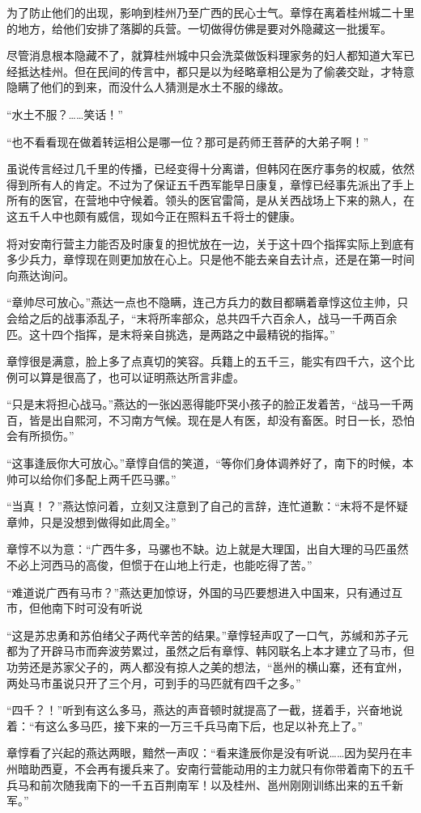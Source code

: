 为了防止他们的出现，影响到桂州乃至广西的民心士气。章惇在离着桂州城二十里的地方，给他们安排了落脚的兵营。一切做得仿佛是要对外隐藏这一批援军。

尽管消息根本隐藏不了，就算桂州城中只会洗菜做饭料理家务的妇人都知道大军已经抵达桂州。但在民间的传言中，都只是以为经略章相公是为了偷袭交趾，才特意隐瞒了他们的到来，而没什么人猜测是水土不服的缘故。

“水土不服？……笑话！”

“也不看看现在做着转运相公是哪一位？那可是药师王菩萨的大弟子啊！”

虽说传言经过几千里的传播，已经变得十分离谱，但韩冈在医疗事务的权威，依然得到所有人的肯定。不过为了保证五千西军能早日康复，章惇已经事先派出了手上所有的医官，在营地中守候着。领头的医官雷简，是从关西战场上下来的熟人，在这五千人中也颇有威信，现如今正在照料五千将士的健康。

将对安南行营主力能否及时康复的担忧放在一边，关于这十四个指挥实际上到底有多少兵力，章惇现在则更加放在心上。只是他不能去亲自去计点，还是在第一时间向燕达询问。

“章帅尽可放心。”燕达一点也不隐瞒，连己方兵力的数目都瞒着章惇这位主帅，只会给之后的战事添乱子，“末将所率部众，总共四千六百余人，战马一千两百余匹。这十四个指挥，是末将亲自挑选，是两路之中最精锐的指挥。”

章惇很是满意，脸上多了点真切的笑容。兵籍上的五千三，能实有四千六，这个比例可以算是很高了，也可以证明燕达所言非虚。

“只是末将担心战马。”燕达的一张凶恶得能吓哭小孩子的脸正发着苦，“战马一千两百，皆是出自熙河，不习南方气候。现在是人有医，却没有畜医。时日一长，恐怕会有所损伤。”

“这事逢辰你大可放心。”章惇自信的笑道，“等你们身体调养好了，南下的时候，本帅可以给你们多配上两千匹马骡。”

“当真！？”燕达惊问着，立刻又注意到了自己的言辞，连忙道歉：“末将不是怀疑章帅，只是没想到做得如此周全。”

章惇不以为意：“广西牛多，马骡也不缺。边上就是大理国，出自大理的马匹虽然不必上河西马的高俊，但惯于在山地上行走，也能吃得了苦。”

“难道说广西有马市？”燕达更加惊讶，外国的马匹要想进入中国来，只有通过互市，但他南下时可没有听说

“这是苏忠勇和苏伯绪父子两代辛苦的结果。”章惇轻声叹了一口气，苏缄和苏子元都为了开辟马市而奔波劳累过，虽然之后有章惇、韩冈联名上本才建立了马市，但功劳还是苏家父子的，两人都没有掠人之美的想法，“邕州的横山寨，还有宜州，两处马市虽说只开了三个月，可到手的马匹就有四千之多。”

“四千？！”听到有这么多马，燕达的声音顿时就提高了一截，搓着手，兴奋地说着：“有这么多马匹，接下来的一万三千兵马南下后，也足以补充上了。”

章惇看了兴起的燕达两眼，黯然一声叹：“看来逢辰你是没有听说……因为契丹在丰州暗助西夏，不会再有援兵来了。安南行营能动用的主力就只有你带着南下的五千兵马和前次随我南下的一千五百荆南军！以及桂州、邕州刚刚训练出来的五千新军。”


